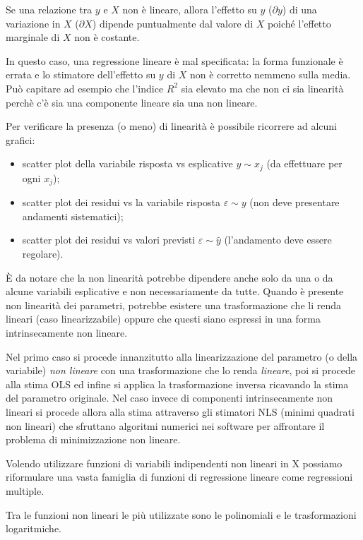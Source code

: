 \documentclass[a4page, 11pt]{article} %
\begin{document}
Se una relazione tra $y$ e $X$ non è lineare, allora l’effetto su $y$ ($\partial y$)  di una variazione in $X$ ($\partial X$) dipende puntualmente dal valore di $X$ poiché l’effetto marginale di $X$ non è costante. 

In questo caso, una regressione lineare è mal specificata: la forma funzionale è errata e lo stimatore dell’effetto su $y$ di $X$ non è corretto nemmeno sulla media. 
Può capitare ad esempio che l'indice $R^{2}$ sia elevato ma che non ci sia linearità perchè c'è sia una componente lineare sia una non lineare. 

Per verificare la presenza (o meno) di linearità è possibile ricorrere ad alcuni grafici: 
\begin{itemize}[noitemsep]
\item scatter plot della variabile risposta vs esplicative $y \sim x_j$ (da effettuare per ogni $x_j$);
\item scatter plot dei residui vs la variabile risposta $\varepsilon \sim y$ (non deve presentare andamenti sistematici);
  \item scatter plot dei residui vs valori previsti $\varepsilon \sim \hat{y}$ (l'andamento deve essere regolare).
\end{itemize}
  
È da notare che la non linearità potrebbe dipendere anche solo da una o da alcune variabili esplicative e non necessariamente da tutte.
Quando è presente non linearità dei parametri, potrebbe esistere una trasformazione che li renda lineari (caso linearizzabile) oppure che questi siano espressi in una forma intrinsecamente non lineare.

Nel primo caso si procede innanzitutto alla linearizzazione del parametro (o della variabile) \textit{non lineare} con una trasformazione che lo renda \textit{lineare}, poi si procede alla stima OLS ed infine si applica la trasformazione inversa ricavando la stima del parametro originale. 
Nel caso invece di componenti intrinsecamente non lineari si procede allora alla stima attraverso gli stimatori NLS (minimi quadrati non lineari) che sfruttano algoritmi numerici nei software per affrontare il problema di minimizzazione non lineare.

Volendo utilizzare funzioni di variabili indipendenti non lineari in X possiamo riformulare una vasta famiglia di funzioni di regressione lineare come regressioni multiple.

Tra le funzioni non lineari le più utilizzate sono le polinomiali e le trasformazioni logaritmiche. 
\end{document}
